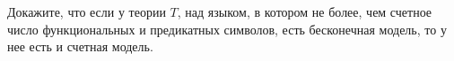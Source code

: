 Докажите, что если у теории $T$, над языком, в котором не более, чем счетное число функциональных и
предикатных символов, есть бесконечная модель, то у нее есть и счетная модель.
